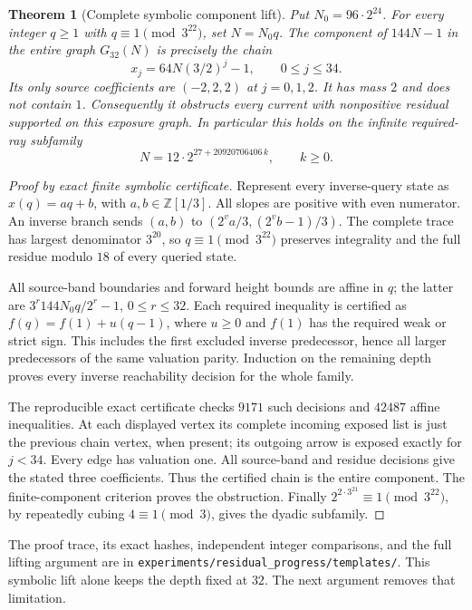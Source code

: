 \documentclass[11pt]{article}
\newtheorem{theorem}{Theorem}
\begin{document}
\begin{theorem}[Complete symbolic component lift]\label{thm:symboliclift}
Put $N_0=96\cdot2^{24}$. For every integer $q\ge1$ with
$q\equiv1\pmod{3^{22}}$, set $N=N_0q$. The component of $144N-1$ in the
entire graph $G_{32}(N)$ is precisely the chain
\[
 x_j=64N(3/2)^j-1,\qquad 0\le j\le34.
\]
Its only source coefficients are $(-2,2,2)$ at $j=0,1,2$.
It has mass $2$ and does not contain $1$. Consequently it obstructs every
current with nonpositive residual supported on this exposure graph.
In particular this holds on the infinite required-ray subfamily
\[
 N=12\cdot2^{27+20920706406\,k},\qquad k\ge0.
\]
\end{theorem}
\begin{proof}[Proof by exact finite symbolic certificate]
Represent every inverse-query state as $x(q)=aq+b$, with
$a,b\in\mathbb Z[1/3]$. All slopes are positive with even numerator.
An inverse branch sends $(a,b)$ to $(2^v a/3,(2^v b-1)/3)$.
The complete trace has largest denominator $3^{20}$, so
$q\equiv1\pmod{3^{22}}$ preserves integrality and the full residue
modulo $18$ of every queried state.

All source-band boundaries and forward height bounds are affine in $q$;
the latter are $3^r144N_0q/2^r-1$, $0\le r\le32$.
Each required inequality is certified as $f(q)=f(1)+u(q-1)$,
where $u\ge0$ and $f(1)$ has the required weak or strict sign.
This includes the first excluded inverse predecessor, hence all larger
predecessors of the same valuation parity. Induction on the remaining
depth proves every inverse reachability decision for the whole family.

The reproducible exact certificate checks $9171$ such decisions and
$42487$ affine inequalities. At each displayed vertex its complete
incoming exposed list is just the previous chain vertex, when present;
its outgoing arrow is exposed exactly for $j<34$. Every edge has
valuation one. All source-band and residue decisions give the stated
three coefficients. Thus the certified chain is the entire component.
The finite-component criterion proves the obstruction.
Finally $2^{2\cdot3^{21}}\equiv1\pmod{3^{22}}$, by repeatedly cubing
$4\equiv1\pmod3$, gives the dyadic subfamily.
\end{proof}

The proof trace, its exact hashes, independent integer comparisons, and
the full lifting argument are in
\texttt{experiments/residual\_progress/templates/}.
This symbolic lift alone keeps the depth fixed at $32$.
The next argument removes that limitation.
\end{document}
